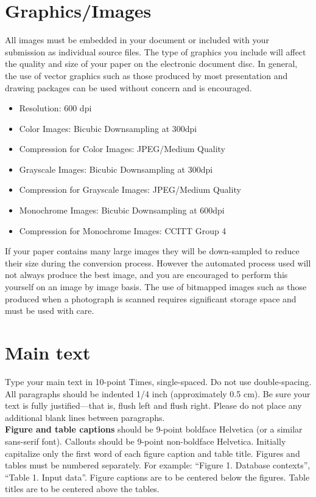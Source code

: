 \documentclass[10pt]{article}
\begin{document}
\section{Graphics/Images}

All images must be embedded in your document or included with your submission as individual source files. The type of graphics you include will affect the quality and size of your paper on the electronic document disc. In general, the use of vector graphics such as those produced by most presentation and drawing packages can be used without concern and is encouraged.

\begin{itemize}
\item Resolution: 600 dpi
\item Color Images: Bicubic Downsampling at 300dpi
\item Compression for Color Images: JPEG/Medium Quality
\item Grayscale Images: Bicubic Downsampling at 300dpi
\item Compression for Grayscale Images: JPEG/Medium Quality
\item Monochrome Images: Bicubic Downsampling at 600dpi
\item Compression for Monochrome Images: CCITT Group 4
\end{itemize}

If your paper contains many large images they will be down-sampled to reduce their size during the conversion process.  However the automated process used will not always produce the best image, and you are encouraged to perform this yourself on an image by image basis. The use of bitmapped images such as those produced when a photograph is scanned requires significant storage space and must be used with care.

\section{Main text}

Type your main text in 10-point Times, single-spaced. Do not use double-spacing. All paragraphs should be indented 1/4 inch (approximately 0.5 cm).  Be sure your text is fully justified—that is, flush left and flush right. Please do not place any additional blank lines between paragraphs. \\
\textbf{Figure and table captions} should be 9-point boldface Helvetica (or a similar sans-serif font).  Callouts should be 9-point non-boldface Helvetica. Initially capitalize only the first word of each figure caption and table title. Figures and tables must be numbered separately. For example: ``Figure 1. Database contexts'', ``Table 1. Input data''. Figure captions are to be centered below the figures. Table titles are to be centered above the tables.
\end{document}
